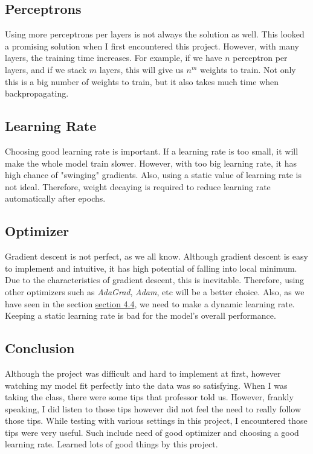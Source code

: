 \documentclass{homework}
\begin{document}
\subsection{Perceptrons}
Using more perceptrons per layers is not always the solution as well. This looked a promising solution when I first encountered this project. However, with many layers, the training time increases. For example, if we have $n$ perceptron per layers, and if we stack $m$ layers, this will give us $n^m$ weights to train. Not only this is a big number of weights to train, but it also takes much time when backpropagating.

\subsection{Learning Rate}
Choosing good learning rate is important. If a learning rate is too small, it will make the whole model train slower. However, with too big learning rate, it has high chance of "swinging" gradients. Also, using a static value of learning rate is not ideal. Therefore, weight decaying is required to reduce learning rate automatically after epochs. 

\subsection{Optimizer}
Gradient descent is not perfect, as we all know. Although gradient descent is easy to implement and intuitive, it has high potential of falling into local minimum. Due to the characteristics of gradient descent, this is inevitable. Therefore, using other optimizers such as \textit{AdaGrad}, \textit{Adam}, etc will be a better choice. Also, as we have seen in the section \hyperref[finetuning]{section 4.4}, we need to make a dynamic learning rate. Keeping a static learning rate is bad for the model's overall performance.

\subsection{Conclusion}
Although the project was difficult and hard to implement at first, however watching my model fit perfectly into the data was so satisfying. When I was taking the class, there were some tips that professor told us. However, frankly speaking, I did listen to those tips however did not feel the need to really follow those tips. While testing with various settings in this project, I encountered those tips were very useful. Such include need of good optimizer and choosing a good learning rate. Learned lots of good things by this project. 
\end{document}

